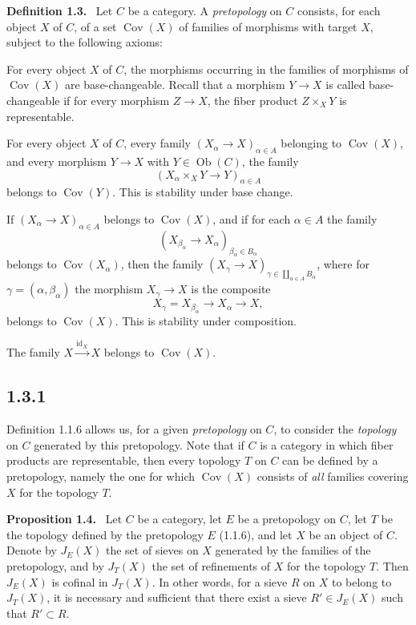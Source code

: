 \documentclass[11pt]{article}
\newcommand{\ob}{\operatorname{Ob}}
\newcommand{\Cov}{\operatorname{Cov}}
\newcommand{\id}{\operatorname{id}}
\newenvironment{statement}[1]{\par\medskip\noindent\textbf{#1.}\ }{\par\medskip}
\begin{document}
\begin{statement}{Definition 1.3}
Let \(C\) be a category. A \emph{pretopology} on \(C\) consists, for each object \(X\) of \(C\), of a set \(\Cov(X)\) of families of morphisms with target \(X\), subject to the following axioms:
\begin{description}[leftmargin=3.2em,style=nextline]
\item[PT 0)] For every object \(X\) of \(C\), the morphisms occurring in the families of morphisms of \(\Cov(X)\) are base-changeable. Recall that a morphism \(Y\to X\) is called base-changeable if for every morphism \(Z\to X\), the fiber product \(Z\times_XY\) is representable.

\item[PT 1)] For every object \(X\) of \(C\), every family \((X_\alpha\to X)_{\alpha\in A}\) belonging to \(\Cov(X)\), and every morphism \(Y\to X\) with \(Y\in\ob(C)\), the family
\[
(X_\alpha\times_XY\to Y)_{\alpha\in A}
\]
belongs to \(\Cov(Y)\). This is stability under base change.

\item[PT 2)] If \((X_\alpha\to X)_{\alpha\in A}\) belongs to \(\Cov(X)\), and if for each \(\alpha\in A\) the family
\[
(X_{\beta_\alpha}\to X_\alpha)_{\beta_\alpha\in B_\alpha}
\]
belongs to \(\Cov(X_\alpha)\), then the family \((X_\gamma\to X)_{\gamma\in\coprod_{\alpha\in A}B_\alpha}\), where for \(\gamma=(\alpha,\beta_\alpha)\) the morphism \(X_\gamma\to X\) is the composite
\[
X_\gamma=X_{\beta_\alpha}\to X_\alpha\to X,
\]
belongs to \(\Cov(X)\). This is stability under composition.

\item[PT 3)] The family \(X\xrightarrow{\id_X}X\) belongs to \(\Cov(X)\).
\end{description}
\end{statement}

\subsection*{1.3.1}
Definition 1.1.6 allows us, for a given \emph{pretopology} on \(C\), to consider the \emph{topology} on \(C\) generated by this pretopology. Note that if \(C\) is a category in which fiber products are representable, then every topology \(T\) on \(C\) can be defined by a pretopology, namely the one for which \(\Cov(X)\) consists of \emph{all} families covering \(X\) for the topology \(T\).

\begin{statement}{Proposition 1.4}
Let \(C\) be a category, let \(E\) be a pretopology on \(C\), let \(T\) be the topology defined by the pretopology \(E\) (1.1.6), and let \(X\) be an object of \(C\). Denote by \(J_E(X)\) the set of sieves on \(X\) generated by the families of the pretopology, and by \(J_T(X)\) the set of refinements of \(X\) for the topology \(T\). Then \(J_E(X)\) is cofinal in \(J_T(X)\). In other words, for a sieve \(R\) on \(X\) to belong to \(J_T(X)\), it is necessary and sufficient that there exist a sieve \(R'\in J_E(X)\) such that \(R'\subset R\).
\end{statement}
\end{document}
